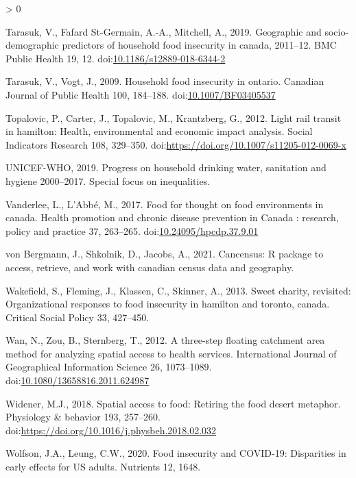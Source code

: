 \documentclass[]{elsarticle} %
\newlength{\cslhangindent}
\newenvironment{CSLReferences}[2] %
 {%
  \setlength{\parindent}{0pt}
  \ifodd #1 \everypar{\setlength{\hangindent}{\cslhangindent}}\ignorespaces\fi
  \ifnum #2 > 0
  \setlength{\parskip}{#2\baselineskip}
  \fi
 }%
 {}
\begin{document}
\begin{CSLReferences}{1}{0}
\leavevmode\hypertarget{ref-tarasuk2019geographic}{}%
Tarasuk, V., Fafard St-Germain, A.-A., Mitchell, A., 2019. Geographic
and socio-demographic predictors of household food insecurity in canada,
2011--12. BMC Public Health 19, 12.
doi:\href{https://doi.org/10.1186/s12889-018-6344-2}{10.1186/s12889-018-6344-2}

\leavevmode\hypertarget{ref-tarasuk2009household}{}%
Tarasuk, V., Vogt, J., 2009. Household food insecurity in ontario.
Canadian Journal of Public Health 100, 184--188.
doi:\href{https://doi.org/10.1007/BF03405537}{10.1007/BF03405537}

\leavevmode\hypertarget{ref-topalovic2012light}{}%
Topalovic, P., Carter, J., Topalovic, M., Krantzberg, G., 2012. Light
rail transit in hamilton: Health, environmental and economic impact
analysis. Social Indicators Research 108, 329--350.
doi:\url{https://doi.org/10.1007/s11205-012-0069-x}

\leavevmode\hypertarget{ref-world2019progress}{}%
UNICEF-WHO, 2019. Progress on household drinking water, sanitation and
hygiene 2000--2017. Special focus on inequalities.

\leavevmode\hypertarget{ref-vanderlee2017food}{}%
Vanderlee, L., L'Abbé, M., 2017. Food for thought on food environments
in canada. Health promotion and chronic disease prevention in Canada :
research, policy and practice 37, 263--265.
doi:\href{https://doi.org/10.24095/hpcdp.37.9.01}{10.24095/hpcdp.37.9.01}

\leavevmode\hypertarget{ref-vonBergmann2021cancensus}{}%
von Bergmann, J., Shkolnik, D., Jacobs, A., 2021. Cancensus: R package
to access, retrieve, and work with canadian census data and geography.

\leavevmode\hypertarget{ref-wakefield2013sweet}{}%
Wakefield, S., Fleming, J., Klassen, C., Skinner, A., 2013. Sweet
charity, revisited: Organizational responses to food insecurity in
hamilton and toronto, canada. Critical Social Policy 33, 427--450.

\leavevmode\hypertarget{ref-wan2012three}{}%
Wan, N., Zou, B., Sternberg, T., 2012. A three-step floating catchment
area method for analyzing spatial access to health services.
International Journal of Geographical Information Science 26,
1073--1089.
doi:\href{https://doi.org/10.1080/13658816.2011.624987}{10.1080/13658816.2011.624987}

\leavevmode\hypertarget{ref-widener2018spatial}{}%
Widener, M.J., 2018. Spatial access to food: Retiring the food desert
metaphor. Physiology \& behavior 193, 257--260.
doi:\url{https://doi.org/10.1016/j.physbeh.2018.02.032}

\leavevmode\hypertarget{ref-wolfson2020food}{}%
Wolfson, J.A., Leung, C.W., 2020. Food insecurity and COVID-19:
Disparities in early effects for US adults. Nutrients 12, 1648.

\end{CSLReferences}
\end{document}
